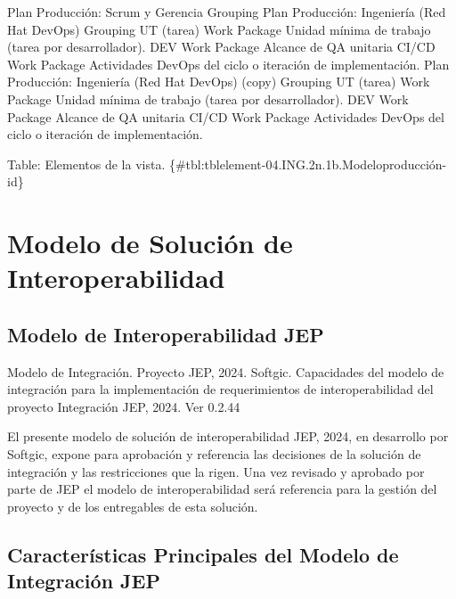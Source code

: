 \documentclass[
  paper=a4,
  ,captions=tableheading
]{scrartcl}
\renewenvironment{quote}{\begin{customblockquote}\list{}{\rightmargin=0em\leftmargin=0em}%
\item\relax\color{blockquote-text}\ignorespaces}{\unskip\unskip\endlist\end{customblockquote}}
\begin{document}
\textbar{} \textbar{} Plan Producción: Scrum y Gerencia \textbar{}
Grouping \textbar{} \textbar{} \textbar{} Plan Producción: Ingeniería
(Red Hat DevOps) \textbar{} Grouping \textbar{} \textbar{} \textbar{} UT
(tarea) \textbar{} Work Package \textbar{} Unidad mínima de trabajo
(tarea por desarrollador). \textbar{} \textbar{} DEV \textbar{} Work
Package \textbar{} Alcance de QA unitaria \textbar{} \textbar{} CI/CD
\textbar{} Work Package \textbar{} Actividades DevOps del ciclo o
iteración de implementación. \textbar{} \textbar{} Plan Producción:
Ingeniería (Red Hat DevOps) (copy) \textbar{} Grouping \textbar{}
\textbar{} \textbar{} UT (tarea) \textbar{} Work Package \textbar{}
Unidad mínima de trabajo (tarea por desarrollador). \textbar{}
\textbar{} DEV \textbar{} Work Package \textbar{} Alcance de QA unitaria
\textbar{} \textbar{} CI/CD \textbar{} Work Package \textbar{}
Actividades DevOps del ciclo o iteración de implementación. \textbar{}

Table: Elementos de la vista.
\{\#tbl:tblelement-04.ING.2n.1b.Modeloproducción-id\}

\newpage

\section{Modelo de Solución de
Interoperabilidad}\label{sec:modelo-de-soluciuxf3n-de-interoperabilidad}

\subsection{Modelo de Interoperabilidad
JEP}\label{sec:modelo-de-interoperabilidad-jep}

\begin{quote}
Modelo de Integración. Proyecto JEP, 2024. Softgic. Capacidades del
modelo de integración para la implementación de requerimientos de
interoperabilidad del proyecto Integración JEP, 2024. Ver 0.2.44
\end{quote}

El presente modelo de solución de interoperabilidad JEP, 2024, en
desarrollo por Softgic, expone para aprobación y referencia las
decisiones de la solución de integración y las restricciones que la
rigen. Una vez revisado y aprobado por parte de JEP el modelo de
interoperabilidad será referencia para la gestión del proyecto y de los
entregables de esta solución.

\subsection{Características Principales del Modelo de Integración
JEP}\label{sec:caracteruxedsticas-principales-del-modelo-de-integraciuxf3n-jep}
\end{document}
